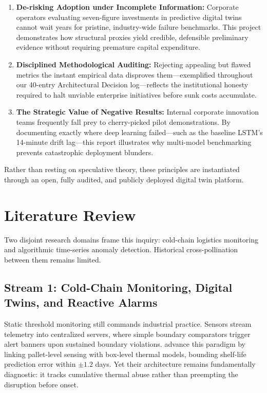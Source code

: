 \documentclass[11pt,a4paper,oneside]{report}
\begin{document}
\begin{enumerate}[leftmargin=*,itemsep=4pt]
    \item \textbf{De-risking Adoption under Incomplete Information:} Corporate operators evaluating seven-figure investments in predictive digital twins cannot wait years for pristine, industry-wide failure benchmarks. This project demonstrates how structural proxies yield credible, defensible preliminary evidence without requiring premature capital expenditure.
    \item \textbf{Disciplined Methodological Auditing:} Rejecting appealing but flawed metrics the instant empirical data disproves them---exemplified throughout our 40-entry Architectural Decision log---reflects the institutional honesty required to halt unviable enterprise initiatives before sunk costs accumulate.
    \item \textbf{The Strategic Value of Negative Results:} Internal corporate innovation teams frequently fall prey to cherry-picked pilot demonstrations. By documenting exactly where deep learning failed---such as the baseline LSTM's 14-minute drift lag---this report illustrates why multi-model benchmarking prevents catastrophic deployment blunders.
\end{enumerate}

Rather than resting on speculative theory, these principles are instantiated through an open, fully audited, and publicly deployed digital twin platform.

\chapter{Literature Review}
\label{chap:literature_review}

Two disjoint research domains frame this inquiry: cold-chain logistics monitoring and algorithmic time-series anomaly detection. Historical cross-pollination between them remains limited.

\section{Stream 1: Cold-Chain Monitoring, Digital Twins, and Reactive Alarms}
\label{sec:lit_stream1}

Static threshold monitoring still commands industrial practice. Sensors stream telemetry into centralized servers, where simple boundary comparators trigger alert banners upon sustained boundary violations. \textcite{meng2024costeffective} advance this paradigm by linking pallet-level sensing with box-level thermal models, bounding shelf-life prediction error within $\pm1.2$ days. Yet their architecture remains fundamentally diagnostic: it tracks cumulative thermal abuse rather than preempting the disruption before onset.
\end{document}
